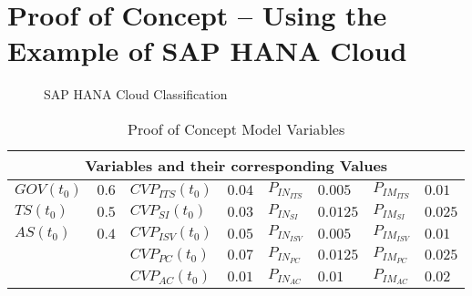 \chapter{Proof of Concept -- Using the Example of SAP HANA Cloud}\label{ch:poc}


\begin{comment}

	GOV 0.6
	TS 0.5
	AS 0.4
	CVP_ITS 0.04
	CVP_ISV 0.05
	CVP_AC 0.01 oder 0.02
	CVP_SI 0.03
	CVP_PC 0.07
	PoAaC_ITS 0.01
	PoAaC_ISV 0.01
	PoAaC_AC 0.02
	PoAaC_SI 0.025
	PoAaC_PC 0.025
	
	Senior Researcher
		expert in 
			a) PaaS development 
			b) Innovation and network theorie

\end{comment}

\begin{figure}[tb]
	\centering
	
	\caption{SAP HANA Cloud Classification}
	\label{fig:cs_sap}
\end{figure}


\begin{table}[t]
	\centering
	\begin{tabular}{llllllll}
		\toprule 
		\multicolumn{8}{c}{\footnotesize \textbf{Variables and their corresponding Values}} \\ \midrule
		\footnotesize $GOV(t_0)$ & \footnotesize $0.6$ & \footnotesize $CVP_{ITS}(t_0)$ & \footnotesize $0.04$ & \footnotesize $P_{IN_{ITS}}$ & \footnotesize $0.005$ & \footnotesize $P_{IM_{ITS}}$ & \footnotesize $0.01$ \\
		\footnotesize $TS(t_0)$ & \footnotesize $0.5$ & \footnotesize $CVP_{SI}(t_0)$ & \footnotesize $0.03$ & \footnotesize $P_{IN_{SI}}$ & \footnotesize $0.0125$ & \footnotesize $P_{IM_{SI}}$ & \footnotesize $0.025$ \\
		\footnotesize $AS(t_0)$ & \footnotesize $0.4$ & \footnotesize $CVP_{ISV}(t_0)$ & \footnotesize $0.05$ & \footnotesize $P_{IN_{ISV}}$ & \footnotesize $0.005$ & \footnotesize $P_{IM_{ISV}}$ & \footnotesize $0.01$ \\
		& & \footnotesize $CVP_{PC}(t_0)$ & \footnotesize $0.07$ & \footnotesize $P_{IN_{PC}}$ & \footnotesize $0.0125$ & \footnotesize $P_{IM_{PC}}$ & \footnotesize $0.025$ \\
		& & \footnotesize $CVP_{AC}(t_0)$ & \footnotesize $0.01$ & \footnotesize $P_{IN_{AC}}$ & \footnotesize $0.01$ & \footnotesize $P_{IM_{AC}}$ & \footnotesize $0.02$ \\ \bottomrule
	\end{tabular}
	\caption{Proof of Concept Model Variables}
	\label{tab:mvar:sap}
\end{table}


